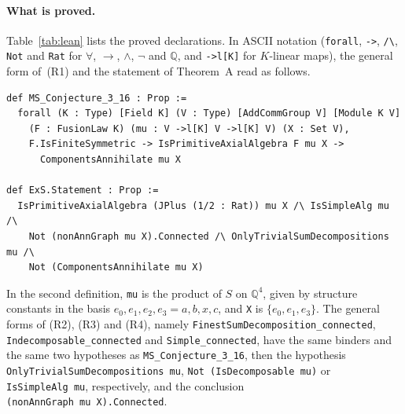 \documentclass[11pt]{article}
\newif\ifwithC
\theoremstyle{definition}
\theoremstyle{remark}
\newcommand{\Q}{\mathbb Q}
\begin{document}
\paragraph{What is proved.}
Table~\ref{tab:lean} lists the proved declarations. In ASCII notation
(\texttt{forall}, \texttt{->}, \verb|/\|, \texttt{Not} and \texttt{Rat} for
$\forall$, $\to$, $\wedge$, $\neg$ and $\Q$, and \verb|->l[K]| for
$K$-linear maps), the general form of~(R1) and the statement of Theorem~A
read as follows.
{\footnotesize
\begin{verbatim}
def MS_Conjecture_3_16 : Prop :=
  forall (K : Type) [Field K] (V : Type) [AddCommGroup V] [Module K V]
    (F : FusionLaw K) (mu : V ->l[K] V ->l[K] V) (X : Set V),
    F.IsFiniteSymmetric -> IsPrimitiveAxialAlgebra F mu X ->
      ComponentsAnnihilate mu X

def ExS.Statement : Prop :=
  IsPrimitiveAxialAlgebra (JPlus (1/2 : Rat)) mu X /\ IsSimpleAlg mu /\
    Not (nonAnnGraph mu X).Connected /\ OnlyTrivialSumDecompositions mu /\
    Not (ComponentsAnnihilate mu X)
\end{verbatim}}
\noindent In the second definition, \texttt{mu} is the product of $S$ on
$\Q^4$, given by structure constants in the basis $e_0,e_1,e_2,e_3=a,b,x,c$,
and \texttt{X} is $\{e_0,e_1,e_3\}$. The general forms of (R2), (R3) and
(R4), namely \texttt{FinestSumDecomposition\_connected},
\texttt{Indecomposable\_connected} and \texttt{Simple\_connected}, have the
same binders and the same two hypotheses as \texttt{MS\_Conjecture\_3\_16},
then the hypothesis \texttt{OnlyTrivialSumDecompositions~mu},
\texttt{Not~(IsDecomposable~mu)} or \texttt{IsSimpleAlg~mu}, respectively,
and the conclusion \texttt{(nonAnnGraph~mu~X).Connected}.
\ifwithC
The general form of (R5), \texttt{Blocks\_indecomposable}, has the same
binders and two hypotheses and the conclusion that
\texttt{IsDecomposableSub~mu~(block~mu~a)} fails for every $a\in X$; the
remaining part of \texttt{Corollary}, \texttt{Dominance\_nonsymmetric}, states
that for some field, space, finite symmetric fusion law and primitive axial
algebra $(V,X)$ there are $a,b\in X$ with \texttt{block~mu~a~<~block~mu~b}.
\fi
\end{document}
